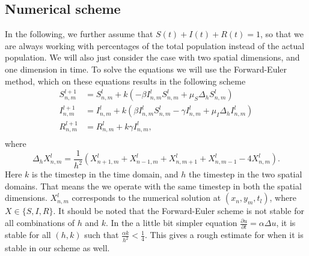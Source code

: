 \subsection{Numerical scheme}
In the following, we further assume that $S(t) + I(t) + R(t) = 1$, so that we are always working with percentages of the total population instead of the actual population.
We will also just consider the case with two spatial dimensions, and one dimension in time.
To solve the equations we will use the Forward-Euler method, which on these equations results in the following scheme
\begin{equation}
    \begin{split}
        S_{n,m}^{l+1} &= S_{n,m}^l + k(-\beta I_{n,m}^l S_{n,m}^l + \mu_S \Delta_h S_{n,m}^l) \\
        I_{n,m}^{l+1} &= I_{n,m}^l + k(\beta I_{n,m}^l S_{n,m}^l - \gamma I_{n,m}^l +  \mu_I \Delta_h I_{n,m}^l) \\
        R_{n,m}^{l+1} &= R_{n,m}^l + k \gamma I_{n,m}^l,  \\
    \end{split}
\end{equation}
where
\begin{equation*}
    \Delta_h X_{n,m}^l = \frac{1}{h^2}(X_{n+1, m}^l + X_{n-1, m}^l + X_{n, m+1}^l + X_{n, m-1}^l - 4X_{n,m}^l).
\end{equation*}
Here $k$ is the timestep in the time domain, and $h$ the timestep in the two spatial domains. That means the we operate with the same timestep in both the spatial dimensions.
$X_{n,m}^l$ corresponds to the numerical solution at $(x_n,y_m,t_l)$, where $X\in \{S,I,R\}$. It should be noted that the Forward-Euler scheme is
not stable for all combinations of $h$ and $k$. In the a little bit simpler equation $\frac{\partial u}{\partial t} = \alpha \Delta u$, it is stable for all $(h,k)$
such that $\frac{\alpha k}{h^2} < \frac{1}{4}$. This gives a rough estimate for when it is stable in our scheme as well.

